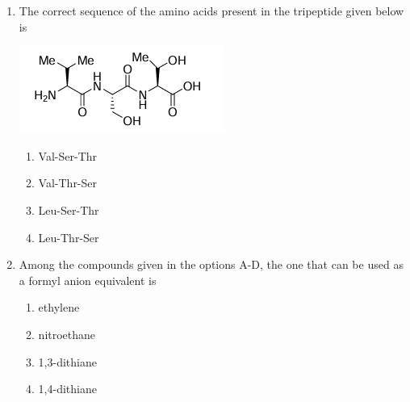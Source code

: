 \documentclass[journal,12pt,onecolumn]{IEEEtran}
\theoremstyle{remark}
\begin{document}
\begin{enumerate}
\item The correct sequence of the amino acids present in the tripeptide given below is
\begin{center}
    \includegraphics[width=0.5\columnwidth]{q18}
\end{center}
\begin{enumerate}
    \item Val-Ser-Thr
    \item Val-Thr-Ser
    \item Leu-Ser-Thr
    \item Leu-Thr-Ser
\end{enumerate}
\hfill \textbf{}

\item Among the compounds given in the options A-D, the one that can be used as a formyl anion equivalent  is
\begin{enumerate}
    \item ethylene
    \item nitroethane
    \item 1,3-dithiane
    \item 1,4-dithiane
\end{enumerate}
\hfill \textbf{}


\end{enumerate}
\end{document}
